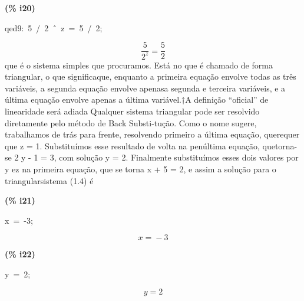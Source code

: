 \documentclass[fleqn]{article}
\begin{document}
\noindent
\begin{minipage}[t]{4.000000em}\color{red}\bfseries
(\% i20)	
\end{minipage}
\begin{minipage}[t]{\textwidth}\color{blue}
qed9:\ 5\ /\ 2\ \^\ \ z\ =\ 5\ /\ 2;
\end{minipage}
\[\displaystyle \tag{qed9} 
\frac{5}{{{2}^{z}}}\mathop{=}\frac{5}{2}\mbox{}
\]
que é o sistema simples que procuramos. Está no que é chamado de forma triangular, o que significaque, enquanto a primeira equação envolve todas as três variáveis, a segunda equação envolve apenasa segunda e terceira variáveis, e a última equação envolve apenas a última variável.†A definição “oficial” de linearidade será adiada
Qualquer sistema triangular pode ser resolvido diretamente pelo método de Back Substi-tução. Como o nome sugere, trabalhamos de trás para frente, resolvendo primeiro a última equação, querequer que z = 1. Substituímos esse resultado de volta na penúltima equação, quetorna-se 2 y - 1 = 3, com solução y = 2. Finalmente substituímos esses dois valores por y ez na primeira equação, que se torna x + 5 = 2, e assim a solução para o triangularsistema (1.4) é


\noindent
\begin{minipage}[t]{4.000000em}\color{red}\bfseries
(\% i21)	
\end{minipage}
\begin{minipage}[t]{\textwidth}\color{blue}
x\ =\ -3;
\end{minipage}
\[\displaystyle \tag{\% o21} 
x\mathop{=}\mathop{-}3\mbox{}
\]


\noindent
\begin{minipage}[t]{4.000000em}\color{red}\bfseries
(\% i22)	
\end{minipage}
\begin{minipage}[t]{\textwidth}\color{blue}
y\ =\ 2;
\end{minipage}
\[\displaystyle \tag{\% o22} 
y\mathop{=}2\mbox{}
\]
\end{document}
